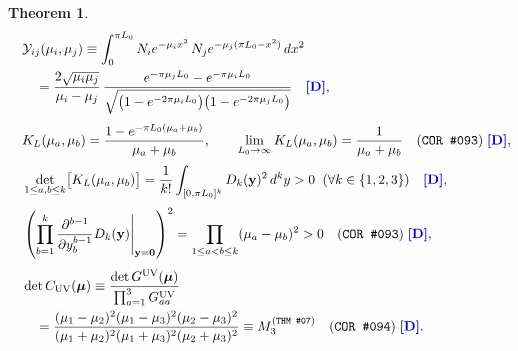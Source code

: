 \documentclass[11pt,a4paper]{article}
\newcommand{\catD}{\text{\textbf{\textcolor{blue!75!black}{[D]}}}}
\theoremstyle{definition}
\theoremstyle{plain}
\newtheorem{theorem}[axiom]{Theorem}
\theoremstyle{remark}
\begin{document}
\begin{theorem}
\begin{align}
    &\begin{aligned}
    &\quad \mathcal{Y}_{ij}(\mu_i, \mu_j) \equiv \int_0^{\pi L_0} N_i e^{-\mu_i x^2}\,N_j e^{-\mu_j(\pi L_0 - x^2)}\,dx^2 \\
    &\qquad = \frac{2\sqrt{\mu_i\mu_j}}{\mu_i - \mu_j}\,\frac{e^{-\pi\mu_j L_0} - e^{-\pi\mu_i L_0}}{\sqrt{\bigl(1 - e^{-2\pi\mu_i L_0}\bigr)\bigl(1 - e^{-2\pi\mu_j L_0}\bigr)}} \quad \catD, \\[3pt]
    &\quad K_L(\mu_a, \mu_b) = \frac{1 - e^{-\pi L_0(\mu_a + \mu_b)}}{\mu_a + \mu_b}, \qquad
    \lim_{L_0 \to \infty} K_L(\mu_a, \mu_b) = \frac{1}{\mu_a + \mu_b} \quad (\text{\texttt{COR~\#093}}) \;\catD, \\[3pt]
    &\quad \det_{1\le a,b\le k}\!\big[K_L(\mu_a, \mu_b)\big] = \frac{1}{k!}\int_{[0, \pi L_0]^k} D_k(\mathbf{y})^2\,d^k y > 0 \;\; (\forall k \in \{1, 2, 3\}) \quad \catD, \\[3pt]
    &\quad \left(\prod_{b=1}^k\frac{\partial^{b-1}}{\partial y_b^{b-1}}D_k(\mathbf{y})\Bigg|_{\mathbf{y}=\mathbf{0}}\right)^2 = \prod_{1\le a<b\le k}(\mu_a - \mu_b)^2 > 0 \quad (\text{\texttt{COR~\#093}}) \;\catD,
    \end{aligned} \label{eq:c5_yukawa_overlap} \\[4pt]
    &\begin{aligned}
    &\quad \det C_{\mathrm{UV}}(\bm{\mu}) \equiv \frac{\det G^{\mathrm{UV}}(\bm{\mu})}{\prod_{a=1}^3 G_{aa}^{\mathrm{UV}}} \\
    &\qquad = \frac{(\mu_1 - \mu_2)^2(\mu_1 - \mu_3)^2(\mu_2 - \mu_3)^2}{(\mu_1 + \mu_2)^2(\mu_1 + \mu_3)^2(\mu_2 + \mu_3)^2} \equiv M_3^{(\text{\texttt{THM~\#07}})} \quad (\text{\texttt{COR~\#094}}) \;\catD.
    \end{aligned} \label{eq:c5_cauchy_loop_closure}
\end{align}
\end{theorem}
\end{document}
